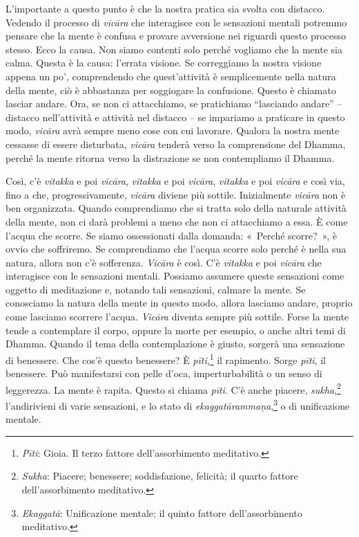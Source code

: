 L'importante a questo punto è che la nostra pratica sia svolta con
distacco. Vedendo il processo di \emph{vicāra} che interagisce con le
sensazioni mentali potremmo pensare che la mente è confusa e provare
avversione nei riguardi questo processo stesso. Ecco la causa. Non siamo
contenti solo perché vogliamo che la mente sia calma. Questa è la causa:
l'errata visione. Se correggiamo la nostra visione appena un po',
comprendendo che quest'attività è semplicemente nella natura della
mente, ciò è abbastanza per soggiogare la confusione. Questo è chiamato
lasciar andare. Ora, se non ci attacchiamo, se pratichiamo ``lasciando
andare'' -- distacco nell'attività e attività nel distacco -- se
impariamo a praticare in questo modo, \emph{vicāra} avrà sempre meno
cose con cui lavorare. Qualora la nostra mente cessasse di essere
disturbata, \emph{vicāra} tenderà verso la comprensione del Dhamma,
perché la mente ritorna verso la distrazione se non contempliamo il
Dhamma.

Così, c'è \emph{vitakka} e poi \emph{vicāra}, \emph{vitakka} e poi
\emph{vicāra}, \emph{vitakka} e poi \emph{vicāra} e così via, fino a
che, progressivamente, \emph{vicāra} diviene più sottile. Inizialmente
\emph{vicāra} non è ben organizzata. Quando comprendiamo che si tratta
solo della naturale attività della mente, non ci darà problemi a meno
che non ci attacchiamo a essa. È come l'acqua che scorre. Se siamo
ossessionati dalla domanda: «~Perché scorre?~», è ovvio che soffriremo.
Se comprendiamo che l'acqua scorre solo perché è nella sua natura,
allora non c'è sofferenza. \emph{Vicāra} è così. C'è \emph{vitakka} e
poi \emph{vicāra} che interagisce con le sensazioni mentali. Possiamo
assumere queste sensazioni come oggetto di meditazione e, notando tali
sensazioni, calmare la mente. Se conosciamo la natura della mente in
questo modo, allora lasciamo andare, proprio come lasciamo scorrere
l'acqua. \emph{Vicāra} diventa sempre più sottile. Forse la mente tende
a contemplare il corpo, oppure la morte per esempio, o anche altri temi
di Dhamma. Quando il tema della contemplazione è giusto, sorgerà una
sensazione di benessere. Che cos'è questo benessere? È
\emph{pīti},\footnote{\emph{Pīti}: Gioia. Il terzo fattore
  dell'assorbimento meditativo.} il rapimento. Sorge \emph{pīti}, il
benessere. Può manifestarsi con pelle d'oca, imperturbabilità o un senso
di leggerezza. La mente è rapita. Questo si chiama \emph{pīti}. C'è
anche piacere, \emph{sukha},\footnote{\emph{Sukha}: Piacere; benessere;
  soddisfazione, felicità; il quarto fattore dell'assorbimento
  meditativo.} l'andirivieni di varie sensazioni, e lo stato di
\emph{ekaggatārammaṇa},\footnote{\emph{Ekaggatā}: Unificazione mentale;
  il quinto fattore dell'assorbimento meditativo.} o di unificazione
mentale.


